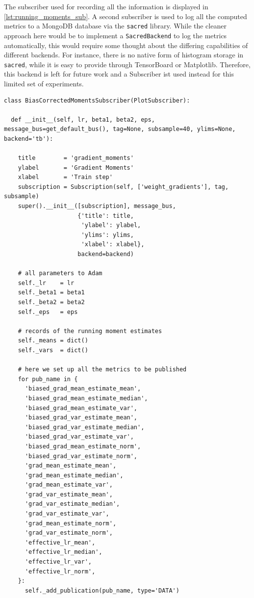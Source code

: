 The subscriber used for recording all the information is displayed in
\cref{lst:running_moments_sub}. A second subscriber is used to log all the
computed metrics to a MongoDB database via the \texttt{sacred} library. While
the cleaner approach here would be to implement a \texttt{SacredBackend} to log
the metrics automatically, this would require some thought about the differing
capabilities of different backends. For instance, there is no native form of
histogram storage in \texttt{sacred}, while it is easy to provide through
TensorBoard or Matplotlib. Therefore, this backend is left for future work and a
Subscriber ist used instead for this limited set of experiments.

\begin{lstlisting}[label={lst:running_moments_sub},
caption={Subscriber to record Adam terms}]
class BiasCorrectedMomentsSubscriber(PlotSubscriber):

  def __init__(self, lr, beta1, beta2, eps, message_bus=get_default_bus(), tag=None, subsample=40, ylims=None, backend='tb'):

    title        = 'gradient_moments'
    ylabel       = 'Gradient Moments'
    xlabel       = 'Train step'
    subscription = Subscription(self, ['weight_gradients'], tag, subsample)
    super().__init__([subscription], message_bus,
                     {'title': title,
                      'ylabel': ylabel,
                      'ylims': ylims,
                      'xlabel': xlabel},
                     backend=backend)

    # all parameters to Adam
    self._lr    = lr
    self._beta1 = beta1
    self._beta2 = beta2
    self._eps   = eps

    # records of the running moment estimates
    self._means = dict()
    self._vars  = dict()

    # here we set up all the metrics to be published
    for pub_name in {
      'biased_grad_mean_estimate_mean',
      'biased_grad_mean_estimate_median',
      'biased_grad_mean_estimate_var',
      'biased_grad_var_estimate_mean',
      'biased_grad_var_estimate_median',
      'biased_grad_var_estimate_var',
      'biased_grad_mean_estimate_norm',
      'biased_grad_var_estimate_norm',
      'grad_mean_estimate_mean',
      'grad_mean_estimate_median',
      'grad_mean_estimate_var',
      'grad_var_estimate_mean',
      'grad_var_estimate_median',
      'grad_var_estimate_var',
      'grad_mean_estimate_norm',
      'grad_var_estimate_norm',
      'effective_lr_mean',
      'effective_lr_median',
      'effective_lr_var',
      'effective_lr_norm',
    }:
      self._add_publication(pub_name, type='DATA')


\end{lstlisting}
